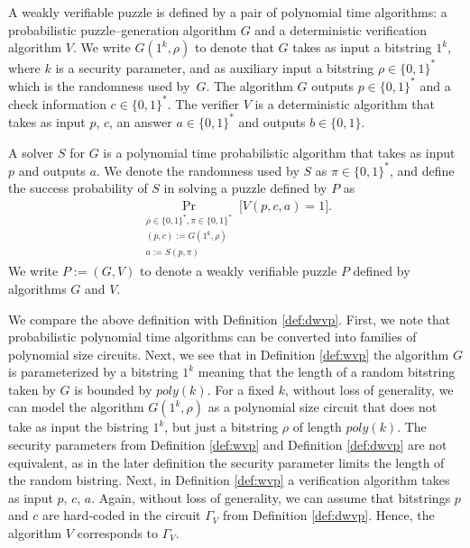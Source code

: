\begin{definition}
  \label{def:wvp}
A \textnormal{weakly verifiable puzzle} is defined by a pair of polynomial time algorithms:
a probabilistic puzzle--generation algorithm $G$ and a deterministic verification algorithm $V$.
We write $G(1^k, \rho)$ to denote that $G$ takes as input a bitstring $1^k$, where $k$ is a security parameter,
and as auxiliary input a bitstring $\rho \in \{0,1\}^{*}$ which is the randomness used by~$G$.
The algorithm $G$ outputs $p \in \{0,1\}^{*}$ and a check information $c \in \{0,1\}^{*}$.
The \textnormal{verifier} $V$ is a deterministic algorithm that takes as input $p$, $c$, an answer $a \in \{0,1\}^{*}$
and outputs $b \in \{0,1\}$.

A \textnormal{solver} $S$ for $G$ is a polynomial time probabilistic algorithm that
takes as input $p$ and outputs $a$. We denote the randomness used by $S$ as $\pi \in \{0,1\}^{*}$,
and define the \textnormal{success probability} of $S$ in solving a puzzle defined by $P$ as
\begin{align*}
  \underset{\substack{\rho \in \{0,1\}^{*}, \pi \in \{0,1\}^{*} \\ (p,c):=G(1^k, \rho) \\ a := S(p, \pi)}}{\Pr}\Big[ V(p,c,a) = 1\Big].
\end{align*}
We write $P := (G,V)$ to denote a weakly verifiable puzzle $P$ defined by algorithms $G$ and $V$.
\end{definition}
We compare the above definition with Definition \ref{def:dwvp}. First, we note that probabilistic polynomial time algorithms can be converted
into families of polynomial size circuits. Next, we see that in Definition \ref{def:wvp} the algorithm $G$ is parameterized by
a bitstring $1^k$ meaning that the length of a random bitstring taken by $G$ is bounded by $poly(k)$.
For a fixed $k$, without loss of generality, we can model the algorithm $G(1^k, \rho)$ as a polynomial size circuit
that does not take as input the bistring $1^k$, but just a bitstring $\rho$ of length $\mathit{poly}(k)$.
The security parameters from Definition \ref{def:wvp} and Definition \ref{def:dwvp} are not equivalent,
as in the later definition the security parameter limits the length of the random bistring.
Next, in Definition \ref{def:wvp} a verification algorithm takes as input $p$, $c$, $a$.
Again, without loss of generality, we can assume that bitstrings $p$ and $c$ are hard-coded
in the circuit $\Gamma_V$ from Definition \ref{def:dwvp}. Hence, the algorithm $V$ corresponds to $\Gamma_V$.

